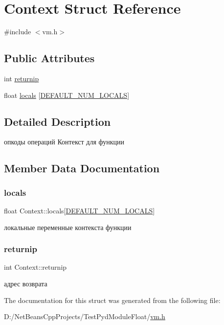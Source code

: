 \hypertarget{struct_context}{}\section{Context Struct Reference}
\label{struct_context}


{\ttfamily \#include $<$vm.\+h$>$}

\subsection*{Public Attributes}
\begin{DoxyCompactItemize}
\item 
int \hyperlink{struct_context_a5459e2352d9678161c460b618fcc02c8}{returnip}
\item 
float \hyperlink{struct_context_aa64dab3c13a109ad402cd112066943ee}{locals} \mbox{[}\hyperlink{vm_8h_ad2267ca313737863ca8ce15da73985c9}{D\+E\+F\+A\+U\+L\+T\+\_\+\+N\+U\+M\+\_\+\+L\+O\+C\+A\+LS}\mbox{]}
\end{DoxyCompactItemize}


\subsection{Detailed Description}
опкоды операций Контекст для функции 

\subsection{Member Data Documentation}
\mbox{\label{struct_context_aa64dab3c13a109ad402cd112066943ee}} 
\subsubsection{\texorpdfstring{locals}{locals}}
{\footnotesize\ttfamily float Context\+::locals\mbox{[}\hyperlink{vm_8h_ad2267ca313737863ca8ce15da73985c9}{D\+E\+F\+A\+U\+L\+T\+\_\+\+N\+U\+M\+\_\+\+L\+O\+C\+A\+LS}\mbox{]}}

локальные переменные контекста функции \mbox{\label{struct_context_a5459e2352d9678161c460b618fcc02c8}} 
\subsubsection{\texorpdfstring{returnip}{returnip}}
{\footnotesize\ttfamily int Context\+::returnip}

адрес возврата 

The documentation for this struct was generated from the following file\+:\begin{DoxyCompactItemize}
\item 
D\+:/\+Net\+Beans\+Cpp\+Projects/\+Test\+Pyd\+Module\+Float/\hyperlink{vm_8h}{vm.\+h}\end{DoxyCompactItemize}
